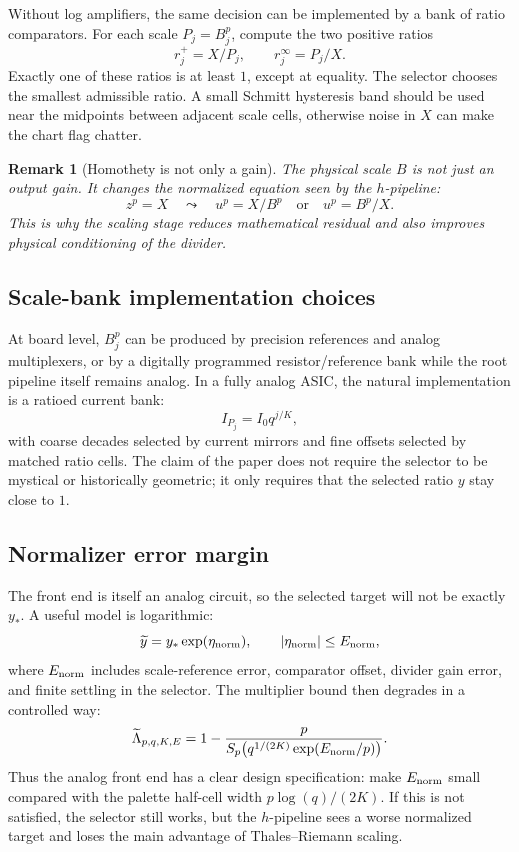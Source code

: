 \documentclass[11pt]{article}
\newtheorem{remark}[definition]{Remark}
\begin{document}
Without log amplifiers, the same decision can be implemented by a bank of
ratio comparators.  For each scale \(P_j=B_j^p\), compute the two positive
ratios
\[
        r_j^+=X/P_j,\qquad r_j^\infty=P_j/X.
\]
Exactly one of these ratios is at least \(1\), except at equality.  The
selector chooses the smallest admissible ratio.  A small Schmitt hysteresis
band should be used near the midpoints between adjacent scale cells, otherwise
noise in \(X\) can make the chart flag chatter.

\begin{remark}[Homothety is not only a gain]
The physical scale \(B\) is not just an output gain.  It changes the normalized
equation seen by the \(h\)-pipeline:
\[
        z^p=X
        \quad\leadsto\quad
        u^p=X/B^p
        \quad\text{or}\quad
        u^p=B^p/X.
\]
This is why the scaling stage reduces mathematical residual and also improves
physical conditioning of the divider.
\end{remark}

\subsection{Scale-bank implementation choices}

At board level, \(B_j^p\) can be produced by precision references and analog
multiplexers, or by a digitally programmed resistor/reference bank while the
root pipeline itself remains analog.  In a fully analog ASIC, the natural
implementation is a ratioed current bank:
\[
        I_{P_j}=I_0 q^{j/K},
\]
with coarse decades selected by current mirrors and fine offsets selected by
matched ratio cells.  The claim of the paper does not require the selector to
be mystical or historically geometric; it only requires that the selected
ratio \(y\) stay close to \(1\).

\subsection{Normalizer error margin}

The front end is itself an analog circuit, so the selected target will not be
exactly \(y_*\).  A useful model is logarithmic:
\[
        \widetilde y=y_*\exp(\eta_{\rm norm}),
        \qquad |\eta_{\rm norm}|\le E_{\rm norm},
\]
where \(E_{\rm norm}\) includes scale-reference error, comparator offset,
divider gain error, and finite settling in the selector.  The multiplier bound
then degrades in a controlled way:
\[
        \widetilde\Lambda_{p,q,K,E}
        =
        1-\frac{p}{S_p\!\left(q^{1/(2K)}\exp(E_{\rm norm}/p)\right)}.
\]
Thus the analog front end has a clear design specification: make
\(E_{\rm norm}\) small compared with the palette half-cell width
\(p\log(q)/(2K)\).  If this is not satisfied, the selector still works, but the
\(h\)-pipeline sees a worse normalized target and loses the main advantage of
Thales--Riemann scaling.
\end{document}
